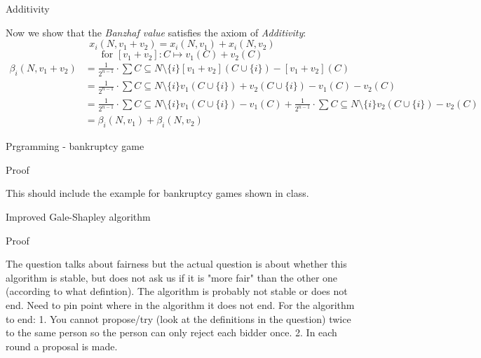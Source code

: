 \documentclass[12pt]{article}
\newenvironment{question}[2][Question]{\begin{trivlist}
\item[\hskip \labelsep {\bfseries #1}\hskip \labelsep {\bfseries #2.}]}{\end{trivlist}}
\newenvironment{answer}[2][Answer]{\begin{trivlist}
\item[\hskip \labelsep {\bfseries #1}\hskip \labelsep {\bfseries #2:}]}{\end{trivlist}}
\begin{document}
\begin{answer}{d)}{Additivity}

Now we show that the \textit{Banzhaf value} satisfies the axiom of \textit{Additivity}:
$$x_i(N,v_1 + v_2)=x_i(N,v_1)+x_i(N,v_2)$$
$$\text{for } [v_1 + v_2]:C \mapsto v_1(C) + v_2(C)$$
\begin{align*}
\beta_i(N,v_1+v_2)&=\frac{1}{2^{n-1}}\cdot \sum{C \subseteq N \setminus \{i\}}{}{[v_1+v_2](C \cup \{i\}) - [v_1+v_2](C)} \\
&=\frac{1}{2^{n-1}}\cdot \sum{C \subseteq N \setminus \{i\}}{}{v_1(C \cup \{i\})+v_2(C \cup \{i\}) - v_1(C) -v_2(C)} \\
&=\frac{1}{2^{n-1}}\cdot \sum{C \subseteq N \setminus \{i\}}{}{v_1(C \cup \{i\}) - v_1(C)} + \frac{1}{2^{n-1}}\cdot \sum{C \subseteq N \setminus \{i\}}{}{v_2(C \cup \{i\}) - v_2(C)} \\
&=\beta_i(N,v_1)+\beta_i(N,v_2)
\end{align*}

\end{answer}
\begin{question}{3}
Prgramming - bankruptcy game
\end{question}
\begin{answer}{a)}{Proof}

This should include the example for bankruptcy games shown in class.
\end{answer}

\begin{question}{5}
Improved Gale-Shapley algorithm
\end{question}
\begin{answer}{a)}{Proof}

The question talks about fairness but the actual question is about whether this algorithm is stable, but does not ask us if it is "more fair" than the other one (according to what defintion).
The algorithm is probably not stable or does not end.
Need to pin point where in the algorithm it does not end.
For the algorithm to end:
1. You cannot propose/try (look at the definitions in the question) twice to the same person so the person can only reject each bidder once.
2. In each round a proposal is made.

\end{answer}
\end{document}
